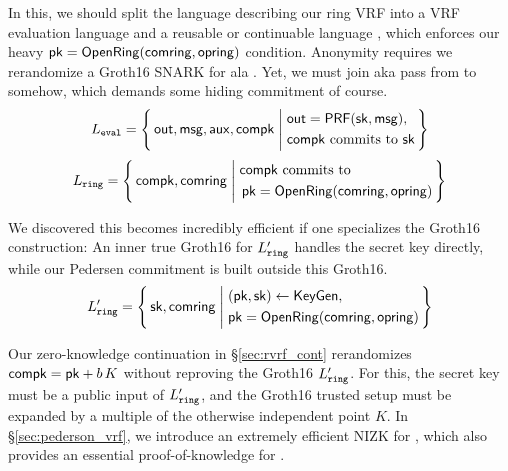 In this, we should split the language describing our ring VRF into
a VRF evaluation language \Leval and a reusable or continuable language
\Lring, which enforces our heavy $\mathsf{pk} = {\mathsf{OpenRing}}(\mathsf{comring},\mathsf{opring})$
condition.  Anonymity requires we rerandomize a Groth16 SNARK for \Lring
ala \cite[Theorem 3, Appendix C, pp. 31]{RandomizationGroth16}.
%
Yet, we must join aka pass \pk from \Lring to \Leval somehow, which
demands some hiding commitment \compk of course.
%
\def\tmpAA{\Out = \PRF(\sk,\msg)}%
\def\tmpBB{\textrm{\compk commits to\ \sk}}%
$$ \Leval = \Setst{ \Out, \msg, \aux, \compk }{
	\eprint{
	\tmpAA, \, \tmpBB
    }{
	\begin{aligned}
	&\tmpAA, \\
	&\tmpBB \\
	\end{aligned}
    }
} $$
\def\tmpAA{\textrm{\compk commits to\ }}%
\def\tmpBB{\OpenRing(\comring,\openring)}%
$$ \Lring = \Setst{ \compk, \comring }{
	\eprint{
	\tmpAA \pk = \tmpBB
	}{
    \begin{aligned}
	&\tmpAA \\
	&\, \pk = \tmpBB \\
    \end{aligned}
	}
} $$

We discovered this becomes incredibly efficient if one specializes
the Groth16 construction:  An inner true Groth16 for $L_{\mathtt{ring}}'$ handles
the secret key \sk directly, while our Pedersen commitment \compk is
built outside this Groth16.  
$$ \Lring' = \Setst{ \sk, \comring}{
    \eprint{
    (\pk,\sk) \leftarrow \KeyGen, \, %
    \pk = \OpenRing(\comring,\openring) 
    }{
    \begin{aligned}
        &(\pk,\sk) \leftarrow \KeyGen, \\
        &\pk = \OpenRing(\comring,\openring)  \\      
    \end{aligned}
    }
} $$

Our zero-knowledge continuation in \S\ref{sec:rvrf_cont} rerandomizes
$\mathsf{compk} = \mathsf{pk} + b \, K$ without reproving the Groth16 $L_{\mathtt{ring}}'$.
For this, the secret key \sk must be a public input of $L_{\mathtt{ring}}'$, and
the Groth16 trusted setup must be expanded by a multiple of
 the otherwise independent point $K$.
%
In \S\ref{sec:pederson_vrf}, we introduce an extremely efficient NIZK
for \Leval, which also provides an essential proof-of-knowledge for \compk.


\endinput





Ring VRFs are firstly ring signatures broadly interpreted, in that they
prove an involved public key lies inside some commitment \comring to
the plausible signer set, known as the ring.
Anyone could compute \comring from this set of public keys.
%
At the same time, ring VRFs prove correct output of a PRF keyed by
the signer's actual secret key, and evaluated on a supplied message \msg,
which then links ring VRF signatures on the same \msg.

\smallskip
